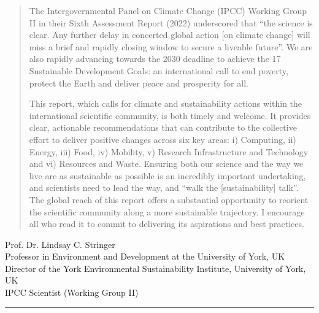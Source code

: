 \documentclass[../SustainableHEP.tex]{subfiles}
\begin{document}
\begin{quotation}
The Intergovernmental Panel on Climate Change (IPCC) Working Group II in their Sixth Assessment Report (2022) underscored that “the science is clear. Any further delay in concerted global action [on climate change] will miss a brief and rapidly closing window to secure a liveable future”. We are also rapidly advancing towards the 2030 deadline to achieve the 17 Sustainable Development Goals: an international call to end poverty, protect the Earth and deliver peace and prosperity for all.

This report, which calls for climate and sustainability actions within the international scientific community, is both timely and welcome. It provides clear, actionable recommendations that can contribute to the collective effort to deliver positive changes across six key areas: i) Computing, ii) Energy, iii) Food, iv) Mobility, v) Research Infrastructure and Technology and vi) Resources and Waste. Ensuring both our science and the way we live are as sustainable as possible is an incredibly important undertaking, and scientists need to lead the way, and “walk the [sustainability] talk”. The global reach of this report offers a substantial opportunity to reorient the scientific community along a more sustainable trajectory. I encourage all who read it to commit to delivering its aspirations and best practices. 
\end{quotation}
\begin{flushleft}
Prof. Dr. Lindsay C. Stringer\\
Professor in Environment and Development at the University of York, UK\\ 
Director of the York Environmental Sustainability Institute, University of York, UK\\
IPCC Scientist (Working Group II)
\end{flushleft}

\textcolor{Pythongreen}{\rule{2cm}{3pt}}
\end{document}
